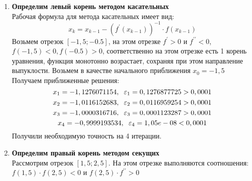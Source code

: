 \documentclass[12pt]{article}
\begin{document}
\begin{enumerate}[label=\textbf{\arabic*})] 
	\item \textbf{Определим левый корень методом касательных} \\
	Рабочая формула для метода касательных имеет вид:
	\begin{equation*}
		x_k = x_{k-1} - (f^\prime(x_{k-1}))^{-1} \cdot f(x_{k-1})
	\end{equation*}
	Возьмем отрезок $[-1,5; -0.5]$, на этом отрезке $f^\prime > 0$ и $f^{\prime \prime} < 0$, $f(-1,5) < 0, f(-0.5) > 0$, соответственно на этом отрезке есть 1 корень уравнения, функция монотонно возрастает, сохраняя при этом направление выпуклости. Возьмем в качестве начального приближения $x_0 = -1,5$ \\
	Получаем приближенные решения:
\begin{equation*}
	x_1 = -1,1276071154, \hspace{0.2cm}
	\varepsilon_1 = 0,1276877725 > 0,0001
\end{equation*}
\begin{equation*}
	x_2 = -1,0116152683, \hspace{0.2cm}
	\varepsilon_2 = 0,0116959254 > 0,0001
\end{equation*}
\begin{equation*}
	x_3 = -1,0000316716, \hspace{0.2cm}
	\varepsilon_3 = 0,0001123287 > 0,0001
\end{equation*}
\begin{equation*}
	x_4 = -0,9999193534, \hspace{0.2cm}
	\varepsilon_4 = 1,05e-08 < 0,0001
\end{equation*}
Получили необходимую точность на 4 итерации.
	\item \textbf{Определим правый корень методом секущих} \\
Рассмотрим отрезок $[1,5; 2,5]$. На этом отрезке выполняются соотношения: \\
$f(1,5) \cdot f(2,5) < 0 $ и $f(2,5) \cdot f^{\prime \prime} > 0 $ 


\end{enumerate}
\end{document}
